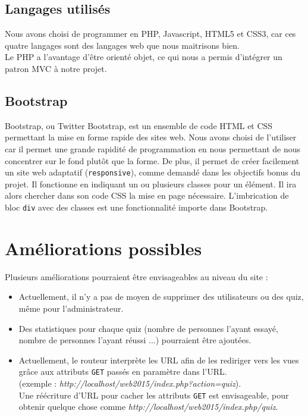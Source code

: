 \documentclass[11pt,titlepage]{article}
\begin{document}
\subsection{Langages utilisés}

Nous avons choisi de programmer en PHP, Javascript, HTML5 et CSS3, car ces quatre langages sont des langages web que nous maitrisons bien.\\
Le PHP a l'avantage d'être orienté objet, ce qui nous a permis d'intégrer un patron MVC à notre projet.

\subsection{Bootstrap}

Bootstrap, ou Twitter Bootstrap, est un ensemble de code HTML et CSS permettant la mise en forme rapide des sites web.
\medbreak
Nous avons choisi de l'utiliser car il permet une grande rapidité de programmation en nous permettant de nous concentrer sur le fond plutôt que la forme. De plus, il permet de créer facilement un site web adaptatif (\texttt{responsive}), comme demandé dans les objectifs bonus du projet.
\medbreak
Il fonctionne en indiquant un ou plusieurs classes pour un élément. Il ira alors chercher dans son code CSS la mise en page nécessaire. L'imbrication de bloc \texttt{div} avec des classes est une fonctionnalité importe dans Bootstrap.

\section{Améliorations possibles}

Plusieurs améliorations pourraient être envisageables au niveau du site :
\begin{itemize}
\item Actuellement, il n'y a pas de moyen de supprimer des utilisateurs ou des quiz, même pour l'administrateur.
\item Des statistiques pour chaque quiz (nombre de personnes l'ayant essayé, nombre de personnes l'ayant réussi ...) pourraient être ajoutées.
\item Actuellement, le routeur interprète les URL afin de les rediriger vers les vues grâce aux attributs \texttt{GET} passés en paramètre dans l'URL.\\ 
(exemple : \textit{http://localhost/web2015/index.php?action=quiz}).\\
Une réécriture d'URL pour cacher les attributs \texttt{GET} est envisageable, pour obtenir quelque chose comme \textit{http://localhost/web2015/index.php/quiz}.
\end{itemize}
\end{document}
